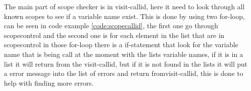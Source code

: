 The main part of scope checker is in visit-callid, here it need to look through all known scopes to see if a variable name exist. This is done by using two for-loop, can be seen in code example \ref{code:scopecallid}, the first one go through scopecontrol and the second one is for each element in the list that are in scopecontrol in those for-loop there is a if-statement that look for the variable name that is being call at the moment with the lists variable names, if it is in a list it will return from the visit-callid, but if it is not found in the lists it will put a error message into the list of errors and return fromvisit-callid, this is done to help with finding more errors.

 
